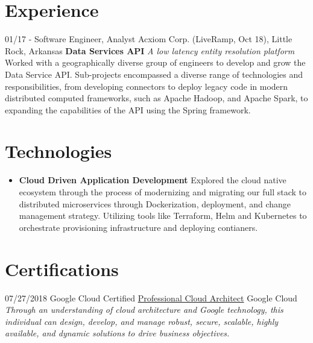 \documentclass[]{friggeri-cv}
\begin{document}
\section{Experience}
\begin{entrylist}
  \entry
    {01/17 - }
    {Software Engineer, Analyst}
    {Acxiom Corp. (LiveRamp, Oct 18), Little Rock, Arkansas}
    {\textbf{Data Services API} \textit{A low latency entity resolution platform} Worked with a geographically diverse group of engineers to develop and grow the Data Service API. Sub-projects encompassed a diverse range of technologies and responsibilities, from developing connectors to deploy legacy code in modern distributed computed frameworks, such as Apache Hadoop, and Apache Spark, to expanding the capabilities of the API using the Spring framework. }
\end{entrylist}

\section{Technologies}
\begin{itemize}
    \item
      {\textbf{Cloud Driven Application Development} Explored the cloud native ecosystem through the process of modernizing and migrating our full stack to distributed microservices through Dockerization, deployment, and change management strategy. Utilizing tools like Terraform, Helm and Kubernetes to orchestrate provisioning infrastructure and deploying contianers. }
\end{itemize}

\section{Certifications}
\begin{entrylist}
 \entry
   {07/27/2018}
   {Google Cloud Certified \href{https://www.credential.net/nwr1hwwq?key=22e8d9d6b741e6ba83b36d6912d092d5bcda893c26b970eed35f9a70da86a45e}{Professional Cloud Architect}}
   {Google Cloud}
   {\textit{Through an understanding of cloud architecture and Google technology, this individual can design, develop, and manage robust, secure, scalable, highly available, and dynamic solutions to drive business objectives.}}
\end{entrylist}
\end{document}
